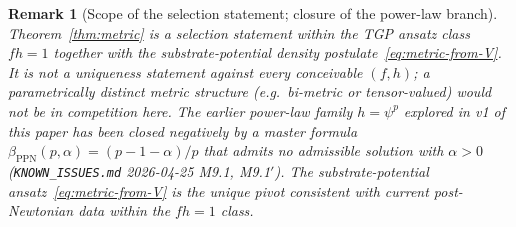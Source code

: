 \documentclass[11pt,a4paper]{article}
\newtheorem{remark}[axiom]{Remark}
\begin{document}
\begin{remark}[Scope of the selection statement; closure of the
power-law branch]\label{rem:metric-scope}
Theorem~\ref{thm:metric} is a selection statement \emph{within} the TGP
ansatz class $fh=1$ together with the substrate-potential density
postulate~\eqref{eq:metric-from-V}. It is not a uniqueness statement
against every conceivable $(f,h)$; a parametrically distinct metric
structure (e.g.\ bi-metric or tensor-valued) would not be in
competition here. The earlier power-law family $h=\psi^{p}$ explored
in v1 of this paper has been closed \emph{negatively} by a master
formula $\beta_{\mathrm{PPN}}(p,\alpha)=(p-1-\alpha)/p$ that admits no
admissible solution with $\alpha>0$
(\texttt{KNOWN\_ISSUES.md} 2026-04-25 M9.1, M9.1$'$). The
substrate-potential ansatz~\eqref{eq:metric-from-V} is the unique
pivot consistent with current post-Newtonian data within the $fh=1$
class.
\end{remark}
\end{document}
